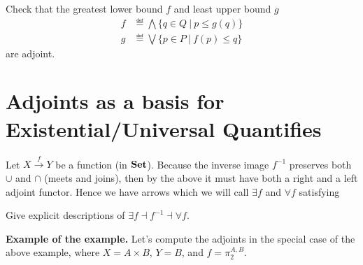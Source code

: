 \begin{exercise}
Check that the greatest lower bound $f$ and least upper bound $g$ 
\begin{align*}
	f &\eqdef \bigwedge \{q \in Q~|~ p \le g(q)\}\\
	g &\eqdef \bigvee \{p \in P~|~ f(p) \le q\}
\end{align*}
are adjoint.
\end{exercise}

\section{Adjoints as a basis for Existential/Universal Quantifies}
\begin{example}
  Let $X \overset{f}\longrightarrow Y$ be a function (in $\mathbf {Set}$). Because the
  inverse image $f^{-1}$ preserves both $\cup$ and $\cap$ (meets and joins), then by the above it must have both a right and a left adjoint functor. Hence we have arrows
  which we will call $\exists f$ and $\forall f$ satisfying
  \begin{center}
  \end{center}

  \begin{exercise}
    Give explicit descriptions of $\exists f \dashv f^{-1} \dashv \forall f$.
  \end{exercise}

  \textbf{Example of the example.} Let's compute the adjoints in the special case of the above example, where $X = A \times B$, $Y = B$, and $f = \pi_2^{A,B}$.
  
  \begin{center}
  \end{center}


\end{example}
